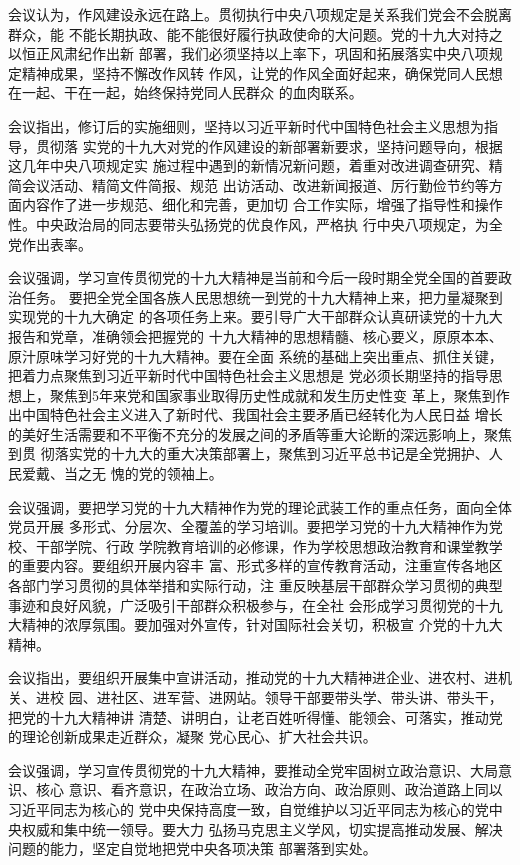 \documentclass[11pt]{ctexart}
\begin{document}
{{{{会议认为，作风建设永远在路上。贯彻执行中央八项规定是关系我们党会不会脱离群众，能
不能长期执政、能不能很好履行执政使命的大问题。党的十九大对持之以恒正风肃纪作出新
部署，我们必须坚持以上率下，巩固和拓展落实中央八项规定精神成果，坚持不懈改作风转
作风，让党的作风全面好起来，确保党同人民想在一起、干在一起，始终保持党同人民群众
的血肉联系。

会议指出，修订后的实施细则，坚持以习近平新时代中国特色社会主义思想为指导，贯彻落
实党的十九大对党的作风建设的新部署新要求，坚持问题导向，根据这几年中央八项规定实
施过程中遇到的新情况新问题，着重对改进调查研究、精简会议活动、精简文件简报、规范
出访活动、改进新闻报道、厉行勤俭节约等方面内容作了进一步规范、细化和完善，更加切
合工作实际，增强了指导性和操作性。中央政治局的同志要带头弘扬党的优良作风，严格执
行中央八项规定，为全党作出表率。

会议强调，学习宣传贯彻党的十九大精神是当前和今后一段时期全党全国的首要政治任务。
要把全党全国各族人民思想统一到党的十九大精神上来，把力量凝聚到实现党的十九大确定
的各项任务上来。要引导广大干部群众认真研读党的十九大报告和党章，准确领会把握党的
十九大精神的思想精髓、核心要义，原原本本、原汁原味学习好党的十九大精神。要在全面
系统的基础上突出重点、抓住关键，把着力点聚焦到习近平新时代中国特色社会主义思想是
党必须长期坚持的指导思想上，聚焦到5年来党和国家事业取得历史性成就和发生历史性变
革上，聚焦到作出中国特色社会主义进入了新时代、我国社会主要矛盾已经转化为人民日益
增长的美好生活需要和不平衡不充分的发展之间的矛盾等重大论断的深远影响上，聚焦到贯
彻落实党的十九大的重大决策部署上，聚焦到习近平总书记是全党拥护、人民爱戴、当之无
愧的党的领袖上。

会议强调，要把学习党的十九大精神作为党的理论武装工作的重点任务，面向全体党员开展
多形式、分层次、全覆盖的学习培训。要把学习党的十九大精神作为党校、干部学院、行政
学院教育培训的必修课，作为学校思想政治教育和课堂教学的重要内容。要组织开展内容丰
富、形式多样的宣传教育活动，注重宣传各地区各部门学习贯彻的具体举措和实际行动，注
重反映基层干部群众学习贯彻的典型事迹和良好风貌，广泛吸引干部群众积极参与，在全社
会形成学习贯彻党的十九大精神的浓厚氛围。要加强对外宣传，针对国际社会关切，积极宣
介党的十九大精神。

会议指出，要组织开展集中宣讲活动，推动党的十九大精神进企业、进农村、进机关、进校
园、进社区、进军营、进网站。领导干部要带头学、带头讲、带头干，把党的十九大精神讲
清楚、讲明白，让老百姓听得懂、能领会、可落实，推动党的理论创新成果走近群众，凝聚
党心民心、扩大社会共识。

会议强调，学习宣传贯彻党的十九大精神，要推动全党牢固树立政治意识、大局意识、核心
意识、看齐意识，在政治立场、政治方向、政治原则、政治道路上同以习近平同志为核心的
党中央保持高度一致，自觉维护以习近平同志为核心的党中央权威和集中统一领导。要大力
弘扬马克思主义学风，切实提高推动发展、解决问题的能力，坚定自觉地把党中央各项决策
部署落到实处。
}}}}
\end{document}
